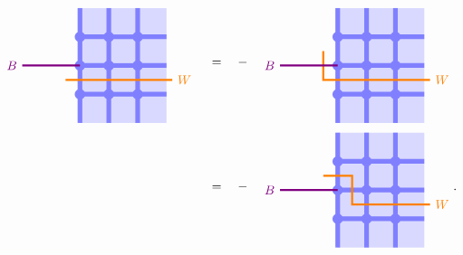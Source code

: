 \documentclass[report,paper=a4, fontsize=12pt, line_length=16cm, number_of_lines=33,dvipdfmx]{jlreq}
\numberwithin{equation}{chapter}
\begin{document}
\begin{align}
  \begin{tikzpicture}[baseline=0cm,scale=0.8]
      \foreach \x in {0,1,2}{
          \foreach \y in {-2,-1,...,1}{
          \fill[plaqblue](\x,\y) rectangle (\x+1,\y+1);
          }
      }
      \foreach \x in {0,1,2}{
          \foreach \y in {-1,0,1}{
              \fill[linkblue] (\x,\y) circle (1.8mm);
          }
      }
      \foreach \x in {0,1,2}{
          \foreach \y in {-1,0,1}{
              \draw[linkblue, line width = 1.3mm](\x,\y)--(\x + 1,\y);
          }
      }
      \foreach \x in {0,1,2}{
          \foreach \y in {-2,-1,...,1}{
              \draw[linkblue, line width = 1.3mm](\x,\y)--(\x,\y + 1);
          }
      }
      \draw[red!50!yellow, ultra thick](-0.5,-0.5)--(3.2,-0.5) node[right]{$W$};
      \draw[red!50!blue, ultra thick](0,0)--(-2,0) node[left]{$B$};
  \end{tikzpicture}
  \quad &=\quad - \quad
  \begin{tikzpicture}[baseline=0cm,scale=0.8]
      \foreach \x in {0,1,2}{
          \foreach \y in {-2,-1,...,1}{
          \fill[plaqblue](\x,\y) rectangle (\x+1,\y+1);
          }
      }
      \foreach \x in {0,1,2}{
          \foreach \y in {-1,0,1}{
              \fill[linkblue] (\x,\y) circle (1.8mm);
          }
      }
      \foreach \x in {0,1,2}{
          \foreach \y in {-1,0,1}{
              \draw[linkblue, line width = 1.3mm](\x,\y)--(\x + 1,\y);
          }
      }
      \foreach \x in {0,1,2}{
          \foreach \y in {-2,-1,...,1}{
              \draw[linkblue, line width = 1.3mm](\x,\y)--(\x,\y + 1);
          }
      }
      \draw[red!50!yellow, ultra thick](-0.5, 0.5)--(-0.5,-0.5)--(3.2,-0.5) node[right]{$W$};
      \draw[red!50!blue, ultra thick](0,0)--(-2,0) node[left]{$B$};
  \end{tikzpicture}
  \notag\\
  &=\quad - \quad
  \begin{tikzpicture}[baseline=0cm,scale=0.8]
      \foreach \x in {0,1,2}{
          \foreach \y in {-2,-1,...,1}{
          \fill[plaqblue](\x,\y) rectangle (\x+1,\y+1);
          }
      }
      \foreach \x in {0,1,2}{
          \foreach \y in {-1,0,1}{
              \fill[linkblue] (\x,\y) circle (1.8mm);
          }
      }
      \foreach \x in {0,1,2}{
          \foreach \y in {-1,0,1}{
              \draw[linkblue, line width = 1.3mm](\x,\y)--(\x + 1,\y);
          }
      }
      \foreach \x in {0,1,2}{
          \foreach \y in {-2,-1,...,1}{
              \draw[linkblue, line width = 1.3mm](\x,\y)--(\x,\y + 1);
          }
      }
      \draw[red!50!yellow, ultra thick](-0.5, 0.5)--(0.5, 0.5)--(0.5,-0.5)--(3.2,-0.5) node[right]{$W$};
      \draw[red!50!blue, ultra thick](0,0)--(-2,0) node[left]{$B$};
  \end{tikzpicture}
  .
\end{align}
\end{document}
